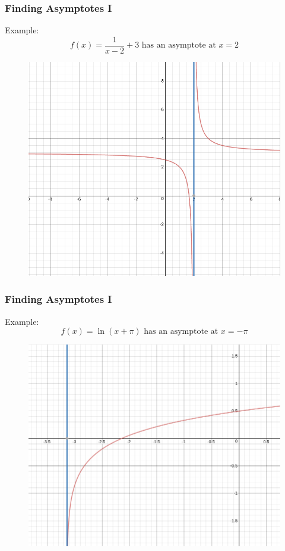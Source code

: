 \documentclass[xcolor=dvipsnames]{beamer}
\begin{document}
\begin{frame}
  \frametitle{Finding Asymptotes I}
Example:
\begin{equation}
  \label{eq:maugeish}
f(x)=\frac{1}{x-2}+3\mbox{ has an asymptote at }x=2
\end{equation}
\begin{figure}[h]
\includegraphics[scale=.25]{./diagrams/asymp1.png}
\end{figure}
\end{frame}

\begin{frame}
  \frametitle{Finding Asymptotes I}
Example:
\begin{equation}
  \label{eq:cheodieh}
f(x)=\ln(x+\pi)\mbox{ has an asymptote at }x=-\pi
\end{equation}
\begin{figure}[h]
\includegraphics[scale=.25]{./diagrams/asymp2.png}
\end{figure}
\end{frame}
\end{document}
